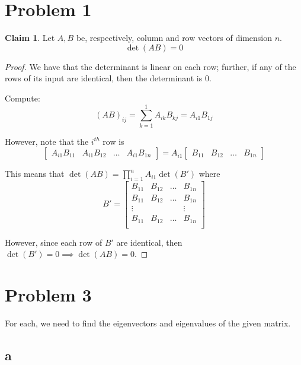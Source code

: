 \documentclass[12pt,letterpaper]{article}
\theoremstyle{definition}
\newtheorem*{claim}{Claim}
\begin{document}
\section*{Problem 1}

\begin{claim}
  Let $A, B$ be, respectively, column and row vectors of dimension $n$.
  \[
    \det(AB) = 0
  \]
\end{claim}

\begin{proof}
  We have that the determinant is linear on each row; further, if any of the
  rows of its input are identical, then the determinant is 0.

  Compute:
  \[
    (AB)_{ij} = \sum_{k=1}^1A_{ik}B_{kj} = A_{i1}B_{1j}
  \]

  However, note that the $i^{th}$ row is
  \[
    \begin{bmatrix}
      A_{i1}B_{11} & A_{i1}B_{12} & \dots & A_{i1}B_{1n}
    \end{bmatrix} =
    A_{i1} \begin{bmatrix}
      B_{11} & B_{12} & \dots & B_{1n}
    \end{bmatrix}
  \]

  This means that $\det(AB) = \prod_{i=1}^nA_{i1}\det(B')$ where
  \[
    B' =
    \begin{bmatrix}
      B_{11} & B_{12} & \dots & B_{1n} \\
      B_{11} & B_{12} & \dots & B_{1n} \\
      \vdots & & & \vdots \\
      B_{11} & B_{12} & \dots & B_{1n} \\
    \end{bmatrix}
  \]

  However, since each row of $B'$ are identical, then $\det(B') = 0 \implies
  \det(AB) = 0$.
\end{proof}

\section*{Problem 3}

For each, we need to find the eigenvectors and eigenvalues of the given matrix. 

\subsection*{a}
\end{document}
